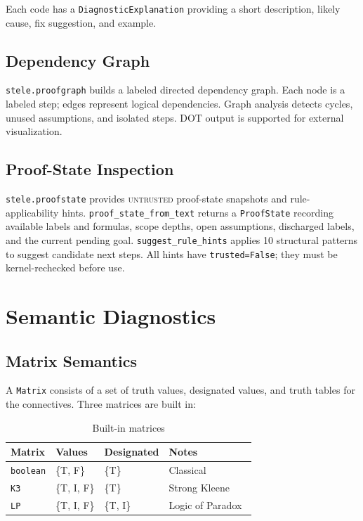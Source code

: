 \documentclass[11pt,a4paper]{article}
\theoremstyle{definition}
\theoremstyle{plain}
\newcommand{\untrusted}{\textsc{untrusted}}
\begin{document}
Each code has a \texttt{DiagnosticExplanation} providing
a short description, likely cause, fix suggestion, and
example.

\subsection{Dependency Graph}

\texttt{stele.proofgraph} builds a labeled directed
dependency graph.
Each node is a labeled step; edges represent logical
dependencies.
Graph analysis detects cycles, unused assumptions, and
isolated steps.
DOT output is supported for external visualization.

\subsection{Proof-State Inspection}

\texttt{stele.proofstate} provides \untrusted{} proof-state
snapshots and rule-applicability hints.
\texttt{proof\_state\_from\_text} returns a \texttt{ProofState}
recording available labels and formulas, scope depths,
open assumptions, discharged labels, and the current pending
goal.
\texttt{suggest\_rule\_hints} applies 10 structural
patterns to suggest candidate next steps.
All hints have \texttt{trusted=False}; they must be
kernel-rechecked before use.

\section{Semantic Diagnostics}
\label{sec:semantics}

\subsection{Matrix Semantics}

A \texttt{Matrix} consists of a set of truth values,
designated values, and truth tables for the connectives.
Three matrices are built in:

\begin{table}[H]
\centering
\caption{Built-in matrices}
\begin{tabular}{@{}llll@{}}
\toprule
Matrix & Values & Designated & Notes \\
\midrule
\texttt{boolean} & \{T, F\} & \{T\} & Classical \\
\texttt{K3} & \{T, I, F\} & \{T\} & Strong Kleene~\cite{Kleene1952} \\
\texttt{LP} & \{T, I, F\} & \{T, I\} & Logic of Paradox~\cite{Priest1979} \\
\bottomrule
\end{tabular}
\end{table}
\end{document}

